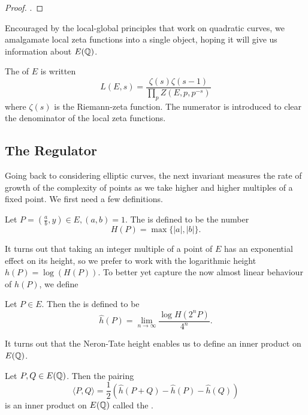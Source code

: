 \documentclass[12pt, a4paper]{amsart}
\begin{document}
\begin{proof}
  \cite[See][Chater II-2, pages 59-61]{modular}.
\end{proof}

Encouraged by the local-global principles that work on quadratic curves, we
amalgamate local zeta functions into a single object, hoping it will give us
information about $E({\mathbb Q})$.

\begin{defn}
  The  of $E$ is written
  \begin{equation} \label{eq:lfunction}
    L(E, s) = \frac{\zeta(s) \zeta(s-1)}{\prod_p Z(E, p, p^{-s})}
  \end{equation}
  where $\zeta(s)$ is the Riemann-zeta function. The numerator is introduced
  to clear the denominator of the local zeta functions.
\end{defn}

\subsection{The Regulator}

Going back to considering elliptic curves, the next invariant measures the
rate of growth of the complexity of points as we take higher and higher
multiples of a fixed point. We first need a few definitions.

\begin{defn}
  Let $P = (\frac{a}{b},y) \in E, (a,b) = 1$. The  is
  defined to be the number
  \[ H(P) = \max \{|a|, |b| \}.\]
\end{defn}

It turns out that taking an integer multiple of a point of $E$ has an
exponential effect on its height, so we prefer to work with the logarithmic
height $h(P) = \log (H(P))$. To better yet capture the now almost linear
behaviour of $h(P)$, we define

\begin{defn}
  Let $P \in E$. Then the  is defined to be
  \[ \hat{h}(P) = \lim\limits_{n \rightarrow \infty} \frac{\log H(2^n P)}{4^n}. \]
\end{defn}

It turns out that the Neron-Tate height enables us to define an inner product
on $E({\mathbb Q})$.

\begin{defn}
  Let $P, Q \in E({\mathbb Q})$. Then the pairing
  \[ \langle P,Q \rangle =
    \frac{1}{2} \left( \hat{h}(P+Q) - \hat{h}(P) - \hat{h}(Q) \right)\]
  is an inner product on $E({\mathbb Q})$ called the .
\end{defn}
\end{document}
